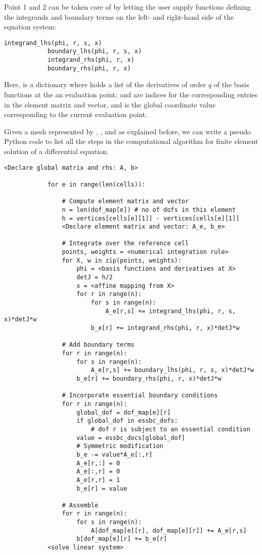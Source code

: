 \documentclass[../main.tex]{subfiles}
\begin{document}
		 Point 1 and 2 can be taken care of by letting the user supply functions defining the integrands and boundary terms on the left- and right-hand side of the equation system:
		 
		\begin{lstlisting}[numbers=none]
			integrand_lhs(phi, r, s, x)
			boundary_lhs(phi, r, s, x)
			integrand_rhs(phi, r, x)
			boundary_rhs(phi, r, x)
		\end{lstlisting}
	 
	 	\noindent Here,  is a dictionary where  holds a list of the derivatives of order $q$ of the basis functions at the an evaluation point;  and  are indices for the corresponding entries in the element matrix and vector, and  is the global coordinate value corresponding to the current evaluation point.
	 	
	 	Given a mesh represented by , , and  as explained before, we can write a pseudo Python code to list all the steps in the computational algorithm for finite element solution of a differential equation.
	 	
	 	\begin{lstlisting}[numbers=none]
			<Declare global matrix and rhs: A, b>
			
			for e in range(len(cells)):
			
				# Compute element matrix and vector
				n = len(dof_map[e]) # no of dofs in this element
				h = vertices[cells[e][1]] - vertices[cells[e][1]]
				<Declare element matrix and vector: A_e, b_e>
			
				# Integrate over the reference cell
				points, weights = <numerical integration rule>
				for X, w in zip(points, weights):
					phi = <basis functions and derivatives at X>
					detJ = h/2
					x = <affine mapping from X>
					for r in range(n):
						for s in range(n):
							A_e[r,s] += integrand_lhs(phi, r, s, x)*detJ*w
						b_e[r] += integrand_rhs(phi, r, x)*detJ*w
			
				# Add boundary terms
				for r in range(n):
					for s in range(n):
						A_e[r,s] += boundary_lhs(phi, r, s, x)*detJ*w
					b_e[r] += boundary_rhs(phi, r, x)*detJ*w
			
				# Incorporate essential boundary conditions
				for r in range(n):
					global_dof = dof_map[e][r]
					if global_dof in essbc_dofs:
						# dof r is subject to an essential condition
					value = essbc_docs[global_dof]
					# Symmetric modification
					b_e -= value*A_e[:,r]
					A_e[r,:] = 0
					A_e[:,r] = 0
					A_e[r,r] = 1
					b_e[r] = value
			
				# Assemble
				for r in range(n):
					for s in range(n):
						A[dof_map[e][r], dof_map[e][r]] += A_e[r,s]
					b[dof_map[e][r] += b_e[r]
			<solve linear system>
		\end{lstlisting}
\clearpage
\end{document}
